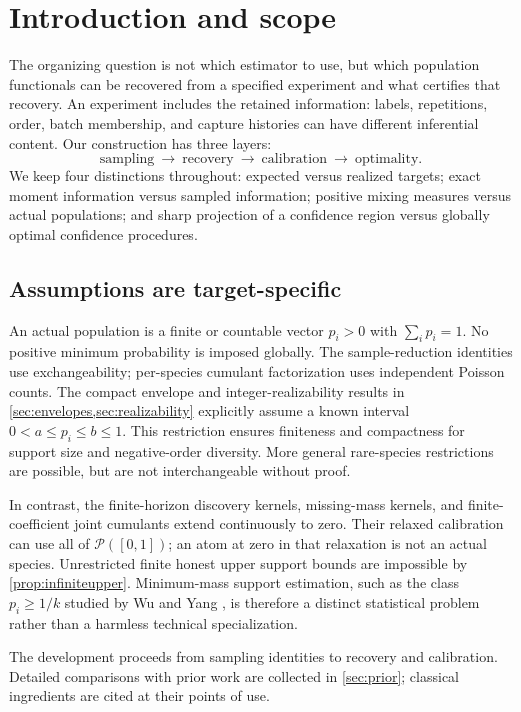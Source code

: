 \documentclass[11pt]{article}
\numberwithin{equation}{section}
\theoremstyle{definition}
\theoremstyle{remark}
\newcommand{\Prob}{\mathcal P}
\begin{document}
\section{Introduction and scope}\label{sec:intro}
The organizing question is not which estimator to use, but which population functionals can be recovered from a specified experiment and what certifies that recovery. An experiment includes the retained information: labels, repetitions, order, batch membership, and capture histories can have different inferential content. Our construction has three layers:
\[
\text{sampling}\ \longrightarrow\ \text{recovery}\ \longrightarrow\ \text{calibration}\ \longrightarrow\ \text{optimality}.
\]
We keep four distinctions throughout: expected versus realized targets; exact moment information versus sampled information; positive mixing measures versus actual populations; and sharp projection of a confidence region versus globally optimal confidence procedures.

\subsection{Assumptions are target-specific}\label{subsec:assumptions}
An actual population is a finite or countable vector $p_i>0$ with $\sum_i p_i=1$. No positive minimum probability is imposed globally. The sample-reduction identities use exchangeability; per-species cumulant factorization uses independent Poisson counts. The compact envelope and integer-realizability results in \cref{sec:envelopes,sec:realizability} explicitly assume a known interval $0<a\le p_i\le b\le1$. This restriction ensures finiteness and compactness for support size and negative-order diversity. More general rare-species restrictions are possible, but are not interchangeable without proof.

In contrast, the finite-horizon discovery kernels, missing-mass kernels, and finite-coefficient joint cumulants extend continuously to zero. Their relaxed calibration can use all of $\Prob([0,1])$; an atom at zero in that relaxation is not an actual species. Unrestricted finite honest upper support bounds are impossible by \cref{prop:infiniteupper}. Minimum-mass support estimation, such as the class $p_i\ge1/k$ studied by Wu and Yang \cite{WuYang2019}, is therefore a distinct statistical problem rather than a harmless technical specialization.

The development proceeds from sampling identities to recovery and calibration.
Detailed comparisons with prior work are collected in \cref{sec:prior};
classical ingredients are cited at their points of use.
\end{document}
